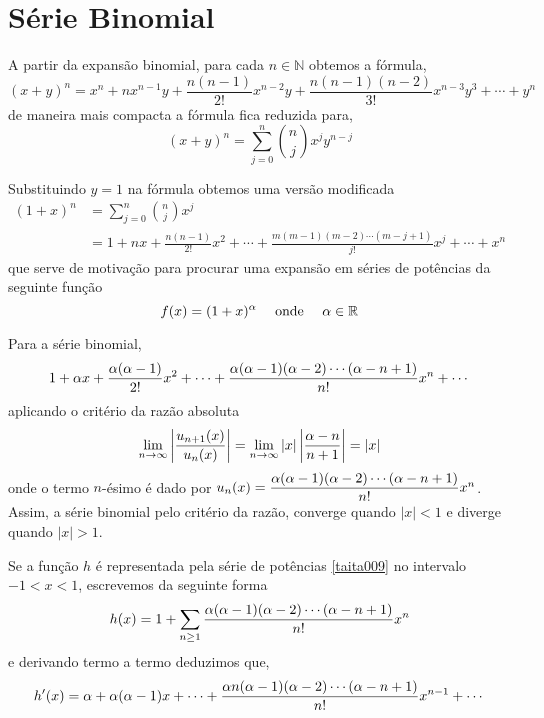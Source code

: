 \section{Série Binomial}

A partir da expansão binomial, para cada $n\in \mathbb{N}$ obtemos a fórmula,
\begin{equation*}
  (x+y)^n=x^n+nx^{n-1}y+\frac{n(n-1)}{2!}x^{n-2}y+\frac{n(n-1)(n-2)}{3!}x^{n-3}y^3+\cdots +y^n
\end{equation*}
de maneira mais compacta a fórmula fica reduzida para,
\begin{equation*}
  (x+y)^n=\sum_{j=0}^{n}\binom{n}{j} x^jy^{n-j}
\end{equation*}

Substituindo $y=1$ na fórmula obtemos uma versão modificada
\begin{align*}
  (1+x)^n&=\sum_{j=0}^{n}\binom{n}{j} x^j&\\[2ex]
         & =1+nx+\frac{n(n-1)}{2!}x^2+\cdots +  \frac{m(m-1)(m-2)\cdots(m-j+1)}{j!}x^j+\cdots+x^n
\end{align*}
que serve de motivação para procurar uma expansão em séries de potências da seguinte função
\begin{equation*}
f(x)=(1+x)^{\alpha} \quad \text{ onde  } \quad  \alpha\in \mathbb{R}
\end{equation*}

Para a série binomial,
\begin{equation}\label{taita009}
1+\alpha x+\frac{\alpha(\alpha-1)}{2!}x^2+\cdots+\frac{\alpha(\alpha-1)(\alpha-2)\cdots(\alpha-n+1)}{n!}x^n+\cdots
\end{equation}
aplicando o critério da razão absoluta
\begin{equation*}
  \lim_{n\to \infty}\left|\frac{u_{n+1}(x)}{u_n(x)} \right|=\lim_{n\to \infty}|x|\left|\frac{\alpha-n}{n+1} \right|=|x|
\end{equation*}
onde o termo $n$-ésimo é dado por $u_n(x)=\dfrac{\alpha(\alpha-1)(\alpha-2)\cdots(\alpha-n+1)}{n!}x^n$. Assim, a  série binomial pelo critério da razão, converge quando $|x|<1$ e diverge quando $|x|>1$.

Se a função $h$ é representada pela série de potências \eqref{taita009} no intervalo $-1<x<1$, escrevemos da seguinte forma
\begin{equation*}
  h(x)=1+\sum_{n \geq 1}\dfrac{\alpha(\alpha-1)(\alpha-2)\cdots(\alpha-n+1)}{n!}x^n
\end{equation*}
e derivando termo a termo deduzimos que,
\begin{equation*}
  h'(x)=\alpha+\alpha(\alpha-1)x+\cdots+\dfrac{\alpha n(\alpha-1)(\alpha-2)\cdots(\alpha-n+1)}{n!}x^{n-1}+\cdots
\end{equation*}

